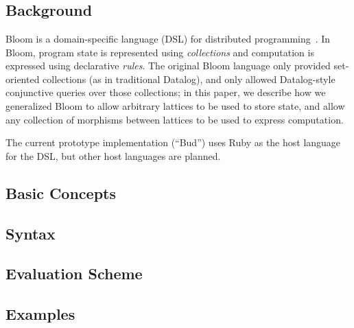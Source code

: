 \section{\lang}

\subsection{Background}
Bloom is a domain-specific language (DSL) for distributed
programming~\cite{Alvaro2011,bloom}. In Bloom, program state is represented
using \emph{collections} and computation is expressed using declarative
\emph{rules}. The original Bloom language only provided set-oriented collections
(as in traditional Datalog), and only allowed Datalog-style conjunctive queries
over those collections; in this paper, we describe how we generalized Bloom to
allow arbitrary lattices to be used to store state, and allow any collection of
morphisms between lattices to be used to express computation.

The current prototype implementation (``Bud'') uses Ruby as the host language
for the DSL, but other host languages are planned.

\subsection{Basic Concepts}

\subsection{Syntax}

\subsection{Evaluation Scheme}

\subsection{Examples}
